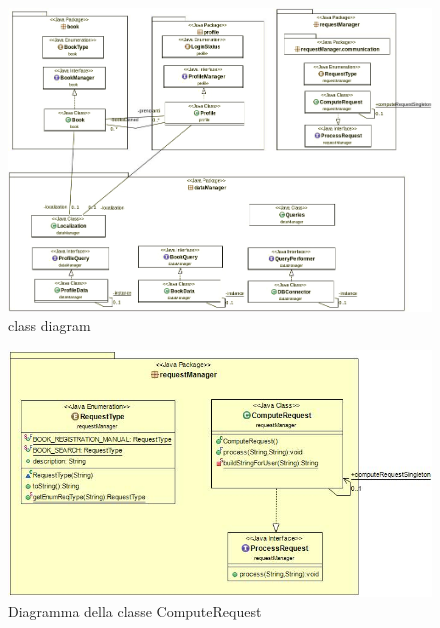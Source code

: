 \begin{figure}[h]
	\includegraphics[width=\textwidth]{Immagini/iterazione_1_uml}
	\caption{class diagram}
	\label{fig:xx}
\end{figure}

\begin{figure}[h]
	\includegraphics[width=\textwidth]{Immagini/UML_ComputeRequestServer}
	\caption{Diagramma della classe ComputeRequest}
	\label{fig:Diagramma della class ComputeRequest}
\end{figure}

